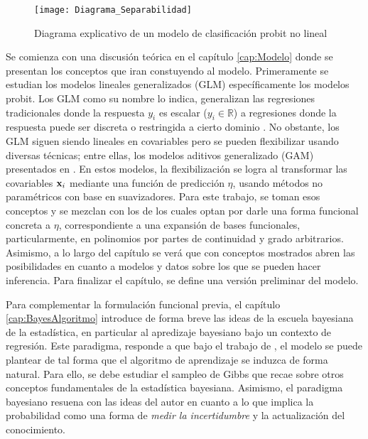 \documentclass[../Main/Main.tex]{subfiles}
\begin{document}
\begin{figure}[h]
  \centering
      \texttt{[image: Diagrama\_Separabilidad]}
  \caption{Diagrama explicativo de un modelo de clasificación probit no lineal}
  \label{fig:DiagramaIntro}
\end{figure}

Se comienza con una discusión teórica en el capítulo \ref{cap:Modelo} donde se presentan los conceptos que iran constuyendo al modelo. Primeramente se estudian los modelos lineales generalizados (GLM) específicamente los modelos probit. Los GLM como su nombre lo indica, generalizan las regresiones tradicionales donde la respuesta $y_i$ es escalar ($y_i \in \mathbb{R}$) a regresiones donde la respuesta puede ser discreta o restringida a cierto dominio \autocite{maccullagh1989generalized}. No obstante, los GLM siguen siendo lineales en covariables pero se pueden flexibilizar usando diversas técnicas; entre ellas, los modelos aditivos generalizado (GAM) presentados en \citet{hastie1986generalized}. En estos modelos, la flexibilización se logra al transformar las covariables $\mathbf{x}_i$ mediante una función de predicción $\eta$, usando métodos no paramétricos con base en suavizadores. Para este trabajo, se toman esos conceptos y se mezclan con los de \citet{mallik1998automatic} los cuales optan por darle una forma funcional concreta a $\eta$, correspondiente a una expansión de bases funcionales, particularmente, en polinomios por partes de continuidad y grado arbitrarios.  Asimismo, a lo largo del capítulo se verá que con conceptos mostrados abren las posibilidades en cuanto a modelos y datos sobre los que se pueden hacer inferencia. Para finalizar el capítulo, se define una versión preliminar del modelo. %

Para complementar la formulación funcional previa, el capítulo \ref{cap:BayesAlgoritmo} introduce de forma breve las ideas de la escuela bayesiana de la estadística, en particular al apredizaje bayesiano bajo un contexto de regresión. Este paradigma, responde a que bajo el trabajo de \citet{albert1993bayesian}, el modelo se puede plantear de tal forma que el algoritmo de aprendizaje se induzca de forma natural. Para ello, se debe estudiar el sampleo de Gibbs que recae sobre otros conceptos fundamentales de la estadística bayesiana. Asimismo, el paradigma bayesiano resuena con las ideas del autor en cuanto a lo que implica la probabilidad como una forma de \emph{medir la incertidumbre} y la actualización del conocimiento.
\end{document}
